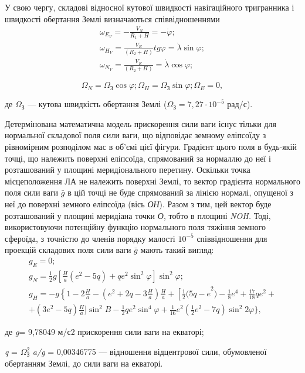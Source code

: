 У свою чергу, складові відносної кутової швидкості навігаційного тригранника і швидкості 
обертання Землі визначаються співвідношеннями
\[\begin{array}{l} 
{\omega_{E_{V}} =-\frac{V_{N}}{R_{1} +H} =-\dot{\varphi};} \\ 
{\omega_{H_{V}} =\frac{V_{E}}{(R_{2} +H)} tg\varphi=\dot{\lambda}\sin \varphi;} \\ 
{\omega_{N_{V}} =\frac{V_{E}}{(R_{2} +H)} =\dot{\lambda}\cos \varphi;} \end{array}\] 

\[\Omega_{N} =\Omega_{\text{З}}\cos \varphi;
\Omega_{H} =\Omega_{\text{З}}\sin \varphi; 
\Omega_{E} =0,\] 

\begin{ESKDexplanation}
 \item де  $\Omega_{\text{З}} $ --- кутова швидкість обертання Землі ($\Omega_{\text{З}}=7,27 \cdot 10^{-5}$ рад/с).
\end{ESKDexplanation}

Детермінована математична модель прискорення сили ваги існує тільки для нормальної 
складової поля сили ваги, що відповідає земному еліпсоїду з рівномірним розподілом 
мас в об'ємі цієї фігури. Градієнт цього поля в будь-якій точці, що належить поверхні 
еліпсоїда, спрямований за нормаллю до неї і розташований у площині меридіонального 
перетину. Оскільки точка місцеположення ЛА не належить поверхні Землі, то вектор 
градієнта нормального поля сили ваги $\bar{g}$ в цій точці не буде спрямований за 
лінією нормалі, опущеної з неї до поверхні земного еліпсоїда (вісь \textit{ОН}). 
Разом з тим, цей вектор буде розташований у площині меридіана точки \textit{О}, тобто 
в площині \textit{NOH. }Тоді, використовуючи  потенційну функцію нормального поля 
тяжіння земного сфероїда, з точністю до членів порядку малості $10^{-5}$  співвідношення 
для проекцій складових поля сили ваги $\bar{g}$ мають такий вигляд:
\[\begin{array}{l} 
{g_{E} =0;} \\
{g_{N} =\frac{1}{2} g[\frac{H}{a} (e^{2} -5q)+qe^{2} \sin^{2}\varphi]\sin^2\varphi;}\\
{g_{H} =-g\left\{1-2\frac{H}{a} -\right. (e^{2} +2q-3\frac{H}{a})
\frac{H}{a} +\left[\frac{1}{2} (5q-e\right. ^{2} )-\frac{1}{8} e^{4} +\frac{17}{18}qe^{2} +} \\ 
{ +(3e^{2} - 5q)\frac{H}{a} ]\sin ^{2} B-\frac{1}{2} qe^{2} \sin ^{4} \varphi+\frac{1}{16} e^{2} 
(\frac{1}{2} e^{2} -7q)\sin ^{2} 2\varphi\},} 
\end{array}\]
\begin{ESKDexplanation}
\item де \textit{g}= 9,78049 м/с2 прискорення сили ваги на екваторі; 
\item \textit{q} = $\Omega_{\text{З}}^{2} $ \textit{a/g} = 0,00346775 --- відношення 
відцентрової сили, обумовленої обертанням Землі, до сили ваги на екваторі. 
\end{ESKDexplanation}

